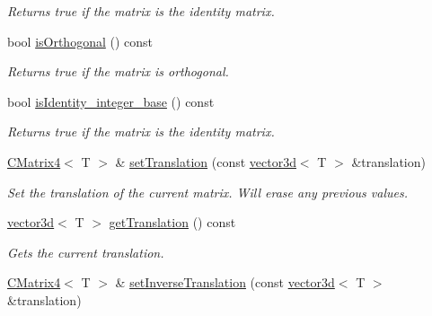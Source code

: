 \begin{DoxyCompactItemize}
\begin{DoxyCompactList}\small\item\em Returns true if the matrix is the identity matrix. \end{DoxyCompactList}\item 
bool \hyperlink{classirr_1_1core_1_1CMatrix4_afc4fe0bdfb771b15eff91264c0ed37f9}{is\+Orthogonal} () const \hypertarget{classirr_1_1core_1_1CMatrix4_afc4fe0bdfb771b15eff91264c0ed37f9}{}\label{classirr_1_1core_1_1CMatrix4_afc4fe0bdfb771b15eff91264c0ed37f9}

\begin{DoxyCompactList}\small\item\em Returns true if the matrix is orthogonal. \end{DoxyCompactList}\item 
bool \hyperlink{classirr_1_1core_1_1CMatrix4_ab4b515a697bb3749a8e1dd9fc31342bd}{is\+Identity\+\_\+integer\+\_\+base} () const \hypertarget{classirr_1_1core_1_1CMatrix4_ab4b515a697bb3749a8e1dd9fc31342bd}{}\label{classirr_1_1core_1_1CMatrix4_ab4b515a697bb3749a8e1dd9fc31342bd}

\begin{DoxyCompactList}\small\item\em Returns true if the matrix is the identity matrix. \end{DoxyCompactList}\item 
\hyperlink{classirr_1_1core_1_1CMatrix4}{C\+Matrix4}$<$ T $>$ \& \hyperlink{classirr_1_1core_1_1CMatrix4_ac04a3b341cbfbb7986be682691655622}{set\+Translation} (const \hyperlink{classirr_1_1core_1_1vector3d}{vector3d}$<$ T $>$ \&translation)\hypertarget{classirr_1_1core_1_1CMatrix4_ac04a3b341cbfbb7986be682691655622}{}\label{classirr_1_1core_1_1CMatrix4_ac04a3b341cbfbb7986be682691655622}

\begin{DoxyCompactList}\small\item\em Set the translation of the current matrix. Will erase any previous values. \end{DoxyCompactList}\item 
\hyperlink{classirr_1_1core_1_1vector3d}{vector3d}$<$ T $>$ \hyperlink{classirr_1_1core_1_1CMatrix4_aec84b278e87611352b75298238e54006}{get\+Translation} () const \hypertarget{classirr_1_1core_1_1CMatrix4_aec84b278e87611352b75298238e54006}{}\label{classirr_1_1core_1_1CMatrix4_aec84b278e87611352b75298238e54006}

\begin{DoxyCompactList}\small\item\em Gets the current translation. \end{DoxyCompactList}\item 
\hyperlink{classirr_1_1core_1_1CMatrix4}{C\+Matrix4}$<$ T $>$ \& \hyperlink{classirr_1_1core_1_1CMatrix4_a258e103fcb6ce1564978624280ecb7fe}{set\+Inverse\+Translation} (const \hyperlink{classirr_1_1core_1_1vector3d}{vector3d}$<$ T $>$ \&translation)\hypertarget{classirr_1_1core_1_1CMatrix4_a258e103fcb6ce1564978624280ecb7fe}{}\label{classirr_1_1core_1_1CMatrix4_a258e103fcb6ce1564978624280ecb7fe}


\end{DoxyCompactItemize}
